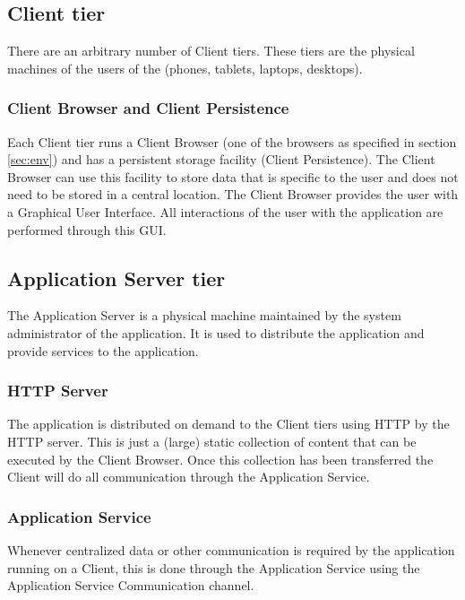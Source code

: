 \subsection{Client tier}
\label{sec:clienttier}
There are an arbitrary number of Client tiers. These tiers are the physical machines of the users of the \applicationname{} (phones, tablets, laptops, desktops).

\subsubsection{Client Browser and Client Persistence}
\label{sec:clientbrowser} 
Each Client tier runs a Client Browser (one of the browsers as specified in section \ref{sec:env}) and has a persistent storage facility (Client Persistence). The Client Browser can use this facility to store data that is specific to the user and does not need to be stored in a central location. The Client Browser provides the user with a Graphical User Interface. All interactions of the user with the application are performed through this GUI.

\subsection{Application Server tier}
\label{sec:aplicationserver}
The Application Server is a physical machine maintained by the system administrator of the application. It is used to distribute the application and provide services to the application.

\subsubsection{HTTP Server}
\label{sec:httpserver}
The application is distributed on demand to the Client tiers using HTTP by the HTTP server. This is just a (large) static collection of content that can be executed by the Client Browser. Once this collection has been transferred the Client will do all communication through the Application Service.

\subsubsection{Application Service}
\label{sec:applicationservice}
Whenever centralized data or other communication is required by the application running on a Client, this is done through the Application Service using the Application Service Communication channel.


